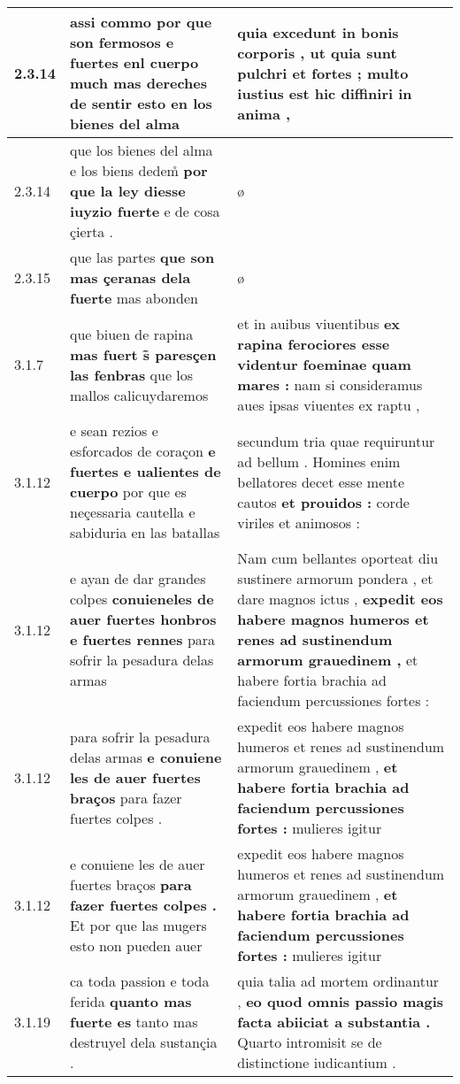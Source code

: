 \begin{tabular}{|p{1cm}|p{6.5cm}|p{6.5cm}|}
2.3.14 & assi commo \textbf{ por que son fermosos e fuertes enl cuerpo } much mas dereches de sentir esto en los bienes del alma & quia excedunt in bonis corporis , \textbf{ ut quia sunt pulchri et fortes ; } multo iustius est hic diffiniri in anima , \\\hline
2.3.14 & que los bienes del alma e los biens dedem̊ \textbf{ por que la ley diesse iuyzio fuerte } e de cosa çierta . & ø \\\hline
2.3.15 & que las partes \textbf{ que son mas çeranas dela fuerte } mas abonden & ø \\\hline
3.1.7 & que biuen de rapina \textbf{ mas fuert s̃ paresçen las fenbras } que los mallos calicuydaremos & et in auibus viuentibus \textbf{ ex rapina ferociores esse videntur foeminae quam mares : } nam si consideramus aues ipsas viuentes ex raptu , \\\hline
3.1.12 & e sean rezios e esforcados de coraçon \textbf{ e fuertes e ualientes de cuerpo } por que es neçessaria cautella e sabiduria en las batallas & secundum tria quae requiruntur ad bellum . Homines enim bellatores decet esse mente cautos \textbf{ et prouidos : } corde viriles et animosos : \\\hline
3.1.12 & e ayan de dar grandes colpes \textbf{ conuieneles de auer fuertes honbros e fuertes rennes } para sofrir la pesadura delas armas & Nam cum bellantes oporteat diu sustinere armorum pondera , et dare magnos ictus , \textbf{ expedit eos habere magnos humeros et renes ad sustinendum armorum grauedinem , } et habere fortia brachia ad faciendum percussiones fortes : \\\hline
3.1.12 & para sofrir la pesadura delas armas \textbf{ e conuiene les de auer fuertes braços } para fazer fuertes colpes . & expedit eos habere magnos humeros et renes ad sustinendum armorum grauedinem , \textbf{ et habere fortia brachia ad faciendum percussiones fortes : } mulieres igitur \\\hline
3.1.12 & e conuiene les de auer fuertes braços \textbf{ para fazer fuertes colpes . } Et por que las mugers esto non pueden auer & expedit eos habere magnos humeros et renes ad sustinendum armorum grauedinem , \textbf{ et habere fortia brachia ad faciendum percussiones fortes : } mulieres igitur \\\hline
3.1.19 & ca toda passion e toda ferida \textbf{ quanto mas fuerte es } tanto mas destruyel dela sustançia . & quia talia ad mortem ordinantur , \textbf{ eo quod omnis passio magis facta abiiciat a substantia . } Quarto intromisit se de distinctione iudicantium . \\\hline

\end{tabular}
